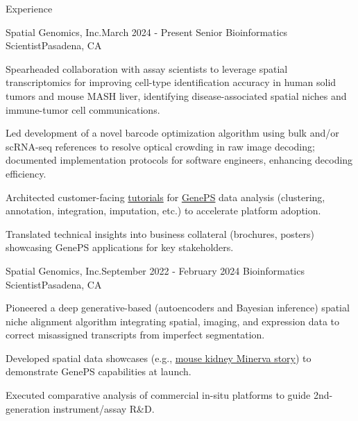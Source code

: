 \documentclass{resume} %
\begin{document}

\begin{rSection}{Experience}
\begin{rSubsection}{Spatial Genomics, Inc.}{March 2024 - Present}
{Senior Bioinformatics Scientist}{Pasadena, CA}
\item Spearheaded collaboration with assay scientists to leverage spatial transcriptomics for improving cell-type identification accuracy in human solid tumors and mouse MASH liver, identifying disease-associated spatial niches and immune-tumor cell communications.

\item Led development of a novel barcode optimization algorithm using bulk and/or scRNA-seq references to resolve optical crowding in raw image decoding; documented implementation protocols for software engineers, enhancing decoding efficiency.

\item Architected customer-facing \href{https://tutorials.spatialgenomics.com/intro.html}{tutorials} for \href{https://spatialgenomics.com/product/}{GenePS} data analysis (clustering, annotation, integration, imputation, etc.) to accelerate platform adoption.

\item Translated technical insights into business collateral (brochures, posters) showcasing GenePS applications for key stakeholders.
\end{rSubsection}

\begin{rSubsection}{Spatial Genomics, Inc.}{September 2022 - February 2024}
{Bioinformatics Scientist}{Pasadena, CA}
\item Pioneered a deep generative-based (autoencoders and Bayesian inference) spatial niche alignment algorithm integrating spatial, imaging, and expression data to correct misassigned transcripts from imperfect segmentation.

\item Developed spatial data showcases (e.g., \href{http://kidneyviewer.spatialgenomics.com/}{mouse kidney Minerva story}) to demonstrate GenePS capabilities at launch.

\item Executed comparative analysis of commercial in-situ platforms to guide 2nd-generation instrument/assay R\&D.


\end{rSubsection}
\end{rSection}
\end{document}
